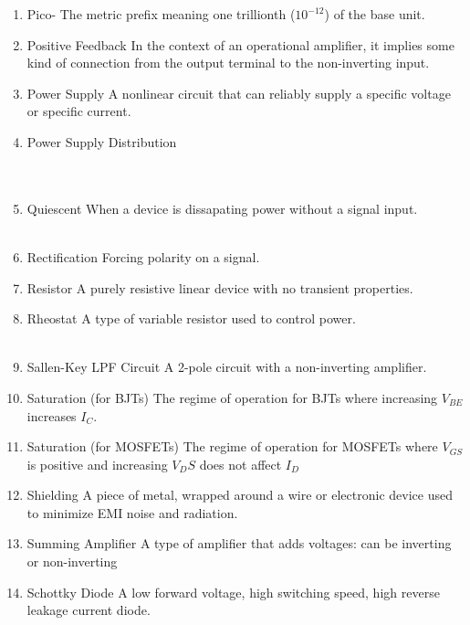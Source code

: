 \documentclass{IEEEtran}
\begin{document}
\begin{enumerate}
\\
\item Pico-
  \subitem The metric prefix meaning one trillionth ($10^{-12}$) of the base unit.\\
\item Positive Feedback
  \subitem In the context of an operational amplifier, it implies some kind of connection from the output terminal to the non-inverting input. \\
\item Power Supply 
  \subitem A nonlinear circuit that can reliably supply a specific voltage or specific current. \\
\item Power Supply Distribution 
  \subitem \\

\\\\
\item Quiescent
  \subitem When a device is dissapating power without a signal input.\\

\\
\item Rectification
  \subitem Forcing polarity on a signal.\\
\item Resistor
  \subitem A purely resistive linear device with no transient properties.\\
\item Rheostat
  \subitem A type of variable resistor used to control power. \\

\\
\item Sallen-Key LPF Circuit
  \subitem A 2-pole circuit with a non-inverting amplifier. \\                 
\item Saturation (for BJTs)
  \subitem The regime of operation for BJTs where increasing $V_{BE}$ increases $I_C$. \\
\item Saturation (for MOSFETs)
  \subitem The regime of operation for MOSFETs where $V_{GS}$ is positive and increasing ${V_DS}$ does not affect $I_D$ \\
\item Shielding
  \subitem A piece of metal, wrapped around a wire or electronic device used to minimize EMI noise and radiation.
\item Summing Amplifier
  \subitem A type of amplifier that adds voltages: can be inverting or non-inverting \\
\item Schottky Diode
  \subitem A low forward voltage, high switching speed, high reverse leakage current diode. \\


\end{enumerate}
\end{document}
